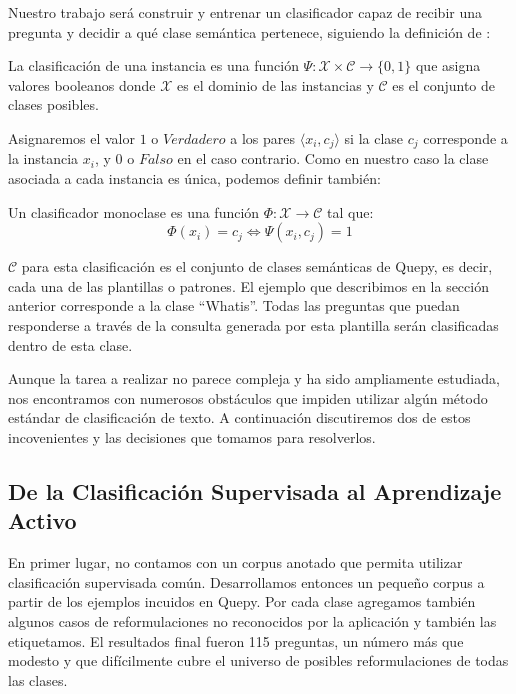 Nuestro trabajo será construir y entrenar un clasificador capaz de recibir una pregunta y decidir a qué clase semántica pertenece, siguiendo la definición de \citet{Sebastiani-text-categorization}:

\begin{definition}
La clasificación de una instancia es una función $\Psi:\mathcal{X} \times \mathcal{C} \rightarrow \{0, 1\}$ que asigna valores booleanos donde $\mathcal{X}$ es el dominio de las instancias y $\mathcal{C}$ es el conjunto de clases posibles.
\end{definition}

Asignaremos el valor $1$ o $Verdadero$ a los pares $\langle x_i, c_j \rangle$ si la clase $c_j$ corresponde a la instancia $x_i$, y $0$ o $Falso$ en el caso contrario. Como en nuestro caso la clase asociada a cada instancia es única, podemos definir también:

\begin{definition}\label{def-clasificacion}
Un clasificador monoclase es una función $\Phi:\mathcal{X} \rightarrow \mathcal{C}$ tal que:
$$ \Phi(x_i) = c_j \Leftrightarrow \Psi(x_i, c_j) = 1 $$
\end{definition}

$\mathcal{C}$ para esta clasificación es el conjunto de clases semánticas de Quepy, es decir, cada una de las plantillas o patrones. El ejemplo que describimos en la sección anterior corresponde a la clase ``Whatis''. Todas las preguntas que puedan responderse a través de la consulta generada por esta plantilla serán clasificadas dentro de esta clase.




Aunque la tarea a realizar no parece compleja y ha sido ampliamente estudiada, nos encontramos con numerosos obstáculos que impiden utilizar algún método estándar de clasificación de texto. A continuación discutiremos dos de estos incovenientes y las decisiones que tomamos para resolverlos.

\subsection{De la Clasificación Supervisada al Aprendizaje Activo}

En primer lugar, no contamos con un corpus anotado que permita utilizar clasificación supervisada común. Desarrollamos entonces un pequeño corpus a partir de los ejemplos incuidos en Quepy. Por cada clase agregamos también algunos casos de reformulaciones no reconocidos por la aplicación y también las etiquetamos. El resultados final fueron 115 preguntas, un número más que modesto y que difícilmente cubre el universo de posibles reformulaciones de todas las clases.

